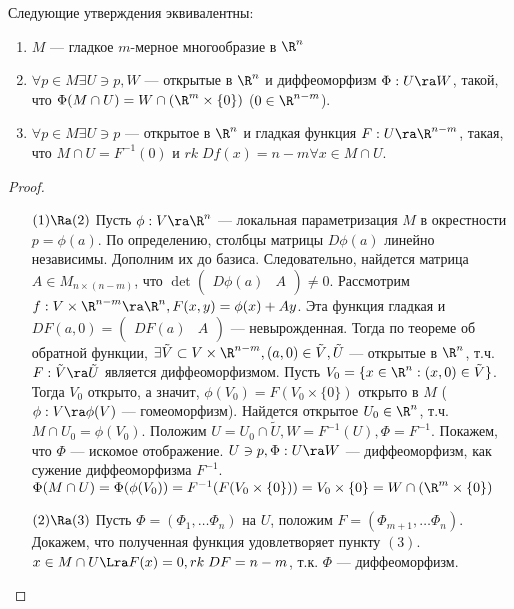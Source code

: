 \begin{theorem}
    Следующие утверждения эквивалентны:
    \begin{enumerate}
        \item \(M\) --- гладкое \(m\)-мерное многообразие в \(\R^n\)
        \item \(\forall p \in M \exists U \ni p, W\) --- открытые в \(\R^n\) и диффеоморфизм \(\Phi: U \ra W\), такой, что \(\Phi(M \cap U) = W \cap (\R^m \times \{0\})\) (\(0 \in \R^{n - m}\)).
        \item \(\forall p \in M \exists U \ni p\) --- открытое в \(\R^n\) и гладкая функция \(F: U \ra \R^{n - m}\), такая, что \(M \cap U = F^{-1}(0)\) и \(rk\;Df(x) = n - m \forall x \in M \cap U\).
    \end{enumerate}
\end{theorem}
\begin{proof}\indent
    \begin{enumerate}
        \item[\((1) \Ra (2)\)] Пусть \(\phi: V \ra \R^n\) --- локальная параметризация \(M\) в окрестности \(p = \phi(a)\). По определению, столбцы матрицы \(D\phi(a)\) линейно независимы. Дополним их до базиса. Следовательно, найдется матрица \(A \in M_{n \times (n - m)}\), что \(\det\left( \begin{array}{cc}
            D\phi(a) & A
        \end{array} \right)\ne 0\). Рассмотрим \(f: V \times \R^{n - m} \ra \R^n, F(x, y) = \phi(x) + Ay\). Эта функция гладкая и \(DF(a, 0) = \left( \begin{array}{cc}
            DF(a) & A
        \end{array} \right)\) --- невырожденная. Тогда по теореме об обратной функции, \(\exists \tilde{V} \subset V \times \R^{n - m}, (a, 0) \in \tilde{V}, \tilde{U}\) --- открытые в \(\R^n\), т.ч. \(F: \tilde{V} \ra \tilde{U}\) является диффеоморфизмом. Пусть \(V_0 = \{x \in \R^n: (x, 0) \in \tilde{V}\}\). Тогда \(V_0\) открыто, а значит, \(\phi(V_0) = F(V_0 \times \{0\})\) открыто в \(M\) (\(\phi: V \ra \phi(V)\) --- гомеоморфизм). Найдется открытое \(U_0 \in \R^n\), т.ч. \(M \cap U_0 = \phi(V_0)\). Положим \(U = U_0 \cap \tilde{U}, W = F^{-1}(U), \Phi = F^{-1}\). Покажем, что \(\Phi\) --- искомое отображение. \(U \ni p, \Phi: U \ra W\) --- диффеоморфизм, как сужение диффеоморфизма \(F^{-1}\). \(\Phi(M \cap U) = \Phi(\phi(V_0)) = F^{-1}(F(V_0 \times \{0\})) = V_0 \times \{0\} = W \cap (\R^m \times \{0\})\)
        \item[\((2) \Ra (3)\)] Пусть \(\Phi = (\Phi_1, \dots \Phi_n)\) на \(U\), положим \(F = (\Phi_{m + 1}, \dots \Phi_n)\). Докажем, что полученная функция удовлетворяет пункту \((3)\). \(x \in M \cap U \Lra F(x) = 0, rk\;DF = n - m\), т.к. \(\Phi\) --- диффеоморфизм.

\end{enumerate}
\end{proof}

